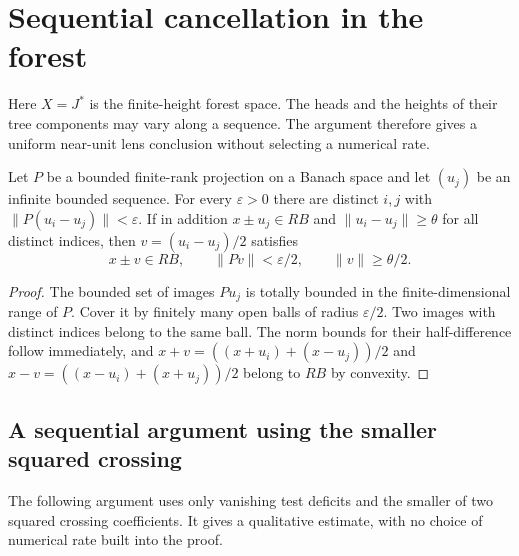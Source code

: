 \section{Sequential cancellation in the forest}\label{sec:sequential-forest}

Here $X=J^*$ is the finite-height forest space. The heads and the
heights of their tree components may vary along a sequence. The
argument therefore gives a uniform near-unit lens conclusion without
selecting a numerical rate.

\begin{lemma}\label{mol:finite-head-pair}
Let $P$ be a bounded finite-rank projection on a Banach space and
let $(u_j)$ be an infinite bounded sequence. For every $\varepsilon>0$
there are distinct $i,j$ with $\|P(u_i-u_j)\|<\varepsilon$.
If in addition $x\pm u_j\in R B$ and
$\|u_i-u_j\|\ge\theta$ for all distinct indices, then
$v=(u_i-u_j)/2$ satisfies
\begin{equation}\label{mol:half-difference}
 x\pm v\in R B,\qquad \|Pv\|<\varepsilon/2,
 \qquad \|v\|\ge\theta/2.
\end{equation}
\end{lemma}
\begin{proof}
The bounded set of images $Pu_j$ is totally bounded in the
finite-dimensional range of $P$. Cover it by finitely many open
balls of radius $\varepsilon/2$. Two images with distinct indices
belong to the same ball. The norm bounds for their half-difference
follow immediately, and
$x+v=((x+u_i)+(x-u_j))/2$ and
$x-v=((x-u_i)+(x+u_j))/2$ belong to $R B$ by convexity.
\end{proof}

\subsection{A sequential argument using the smaller squared crossing}
\label{mola:sequential-section}
The following argument uses only vanishing test deficits and the smaller
of two squared crossing coefficients.  It gives a qualitative estimate,
with no choice of numerical rate built into the proof.

